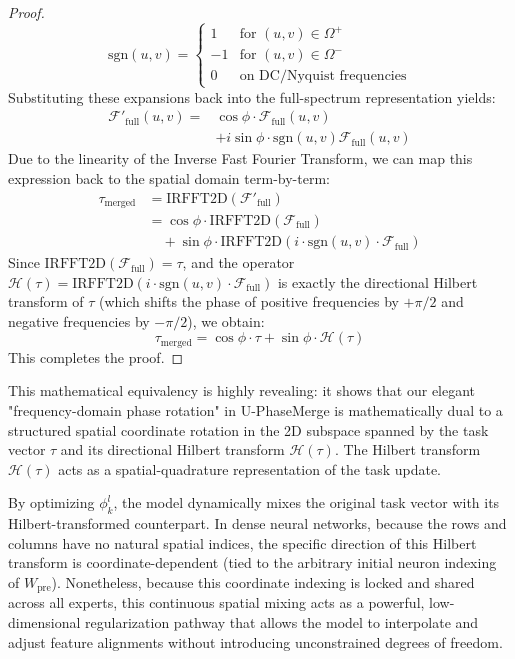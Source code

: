 \begin{proof}
\begin{equation}
    \text{sgn}(u, v) = \begin{cases} 
    1 & \text{for } (u, v) \in \Omega^+ \\ 
    -1 & \text{for } (u, v) \in \Omega^- \\ 
    0 & \text{on DC/Nyquist frequencies}
    \end{cases}
\end{equation}
Substituting these expansions back into the full-spectrum representation yields:
\begin{align}
    \mathcal{F}'_{\text{full}}(u, v) = &\cos\phi \cdot \mathcal{F}_{\text{full}}(u, v) \nonumber \\
    &+ i \sin\phi \cdot \text{sgn}(u, v) \mathcal{F}_{\text{full}}(u, v)
\end{align}
Due to the linearity of the Inverse Fast Fourier Transform, we can map this expression back to the spatial domain term-by-term:
\begin{align}
    \tau_{\text{merged}} &= \text{IRFFT2D}\left( \mathcal{F}'_{\text{full}} \right) \nonumber \\
    &= \cos\phi \cdot \text{IRFFT2D}\left( \mathcal{F}_{\text{full}} \right) \nonumber \\
    &\quad + \sin\phi \cdot \text{IRFFT2D}\left( i \cdot \text{sgn}(u, v) \cdot \mathcal{F}_{\text{full}} \right)
\end{align}
Since $\text{IRFFT2D}(\mathcal{F}_{\text{full}}) = \tau$, and the operator $\mathcal{H}(\tau) = \text{IRFFT2D}(i \cdot \text{sgn}(u, v) \cdot \mathcal{F}_{\text{full}})$ is exactly the directional Hilbert transform of $\tau$ (which shifts the phase of positive frequencies by $+\pi/2$ and negative frequencies by $-\pi/2$), we obtain:
\begin{equation}
    \tau_{\text{merged}} = \cos\phi \cdot \tau + \sin\phi \cdot \mathcal{H}(\tau)
\end{equation}
This completes the proof.
\end{proof}

This mathematical equivalency is highly revealing: it shows that our elegant "frequency-domain phase rotation" in U-PhaseMerge is mathematically dual to a structured spatial coordinate rotation in the 2D subspace spanned by the task vector $\tau$ and its directional Hilbert transform $\mathcal{H}(\tau)$. The Hilbert transform $\mathcal{H}(\tau)$ acts as a spatial-quadrature representation of the task update. 

By optimizing $\phi_k^l$, the model dynamically mixes the original task vector with its Hilbert-transformed counterpart. In dense neural networks, because the rows and columns have no natural spatial indices, the specific direction of this Hilbert transform is coordinate-dependent (tied to the arbitrary initial neuron indexing of $W_{\text{pre}}$). Nonetheless, because this coordinate indexing is locked and shared across all experts, this continuous spatial mixing acts as a powerful, low-dimensional regularization pathway that allows the model to interpolate and adjust feature alignments without introducing unconstrained degrees of freedom.

